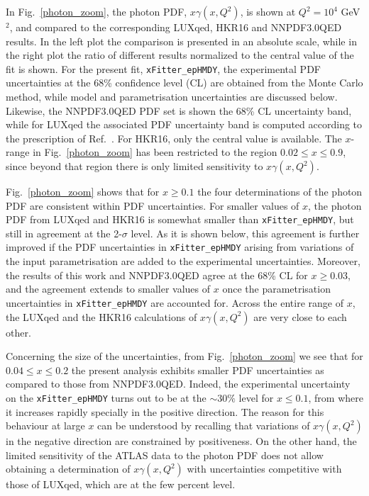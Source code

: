 In Fig.~\ref{photon_zoom}, the photon PDF, $x\gamma(x,Q^2)$, is shown at
$Q^2=10^4$ GeV$^2$,  and compared to the corresponding LUXqed,
HKR16 and NNPDF3.0QED results.
%
In the left plot the comparison is presented in an absolute scale, while
in the right plot the ratio of
different results normalized to
the central value of the fit is shown.
%
For the present fit, {\tt xFitter\_epHMDY}, 
the experimental PDF uncertainties at the 68\% confidence level (CL) are obtained from the Monte Carlo method,
 while model and parametrisation uncertainties are discussed below.
Likewise, the  NNPDF3.0QED PDF set is shown the 68\% CL uncertainty band,
while for LUXqed the associated PDF uncertainty band is computed according to the
prescription of Ref.~\cite{Manohar:2016nzj}.
For HKR16, only the central value is available.
%
The $x$-range in Fig.~\ref{photon_zoom} has been restricted to the region
$0.02 \le x \le 0.9$, since beyond that region there is only limited sensitivity to $x\gamma(x,Q^2)$.

Fig.~\ref{photon_zoom} shows that for $x\ge 0.1$ the four determinations of
the photon PDF are consistent within PDF uncertainties.
%
For smaller values of $x$, the photon PDF from LUXqed and HKR16 is somewhat smaller than {\tt xFitter\_epHMDY},
but still in agreement at the 2-$\sigma$ level.
%
As it is shown below, this agreement is further improved if the PDF uncertainties in
{\tt xFitter\_epHMDY}
arising from variations of the input parametrisation are added to the experimental
uncertainties.
%
Moreover, the results of this work and NNPDF3.0QED agree at the 68\% CL for $x\ge 0.03$,
and the agreement extends to smaller values of $x$ once the parametrisation
uncertainties in {\tt xFitter\_epHMDY} are accounted for.
%
Across the entire range of $x$, the LUXqed and the HKR16 calculations of $x\gamma(x,Q^2)$ are very close
to each other.

Concerning the size of the uncertainties, from Fig.~\ref{photon_zoom} we see that
for $0.04 \le x \le 0.2$ the present analysis  exhibits smaller PDF
uncertainties as compared to those from  NNPDF3.0QED.
%
Indeed, the experimental uncertainty on the {\tt xFitter\_epHMDY}
turns out to be at the  $\sim 30\%$ level for $x\le 0.1$, from where it increases
rapidly specially in the positive direction.
%
The reason for this behaviour at large $x$ can be understood by recalling that
variations of $x\gamma(x,Q^2)$ in the negative
direction are constrained by positiveness.
%
On the other hand, the limited sensitivity of the ATLAS data to the photon
PDF does not allow obtaining a determination of $x\gamma(x,Q^2)$ with uncertainties
competitive with those of LUXqed, which are at the few percent level.


